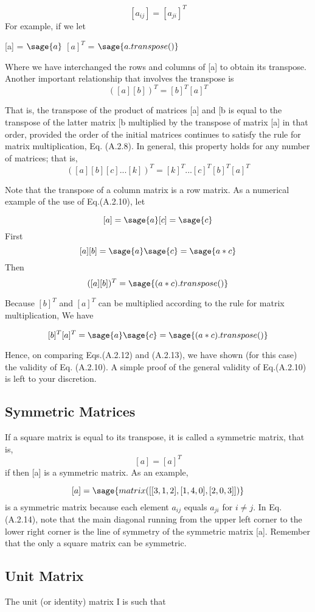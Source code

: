 \documentclass[12pt]{report}
\newcommand{\gen}[1]{
[#1_{{ij}}]
}
\begin{document}
\[\gen{a} =[a_{{ji}}]^T\]
For example, if we let
\begin{center}
[a] = $\sage{a}$
$[a]^T$ = $\sage{a.transpose()}$
\end{center}

Where we have interchanged the rows and columns of [a] to
obtain its transpose.
Another important relationship that involves the
transpose is
$$ ([a][b])^T = [b]^T [a]^T $$

That is, the transpose of the product of matrices [a] and
[b is equal to the transpose of the latter matrix
[b multiplied by the transpose of matrix [a] in
that order, provided the order of the initial matrices continues to
satisfy the rule for matrix multiplication, Eq. (A.2.8). In general,
this property holds for any number of matrices; that is,
$$([a][b][c]...[k])^T = [k]^T... [c]^T[b]^T[a]^T $$ 

Note that the transpose of a column matrix is a row matrix. As a
numerical example of the use of Eq.(A.2.10), let

$$[a] = \sage{a}  [c] = \sage{c}$$
First$$[a][b] = \sage{a}\sage{c}=\sage{a*c}$$
Then $$([a][b])^T= \sage{(a*c).transpose()}$$

Because $[b]^T$ and $[a]^T$ can be multiplied
according to the rule for matrix multiplication, We have

$$ [b]^T[a]^T = \sage{a} \sage{c} = \sage{(a*c).transpose()}$$

Hence, on comparing Eqs.(A.2.12) and (A.2.13), we have shown (for this
case) the validity of Eq. (A.2.10). A simple proof of the general
validity of Eq.(A.2.10) is left to your discretion.
\subsection{Symmetric Matrices}
If a square matrix is equal to its transpose, it is called a symmetric
matrix, that is,
$$ [a] = [a]^T $$
 if then [a] is a symmetric matrix. As an
example,

$$[a]=\sage{matrix([[3,1,2],[1,4,0],[2,0,3]])}$$
is a symmetric matrix because each element $a_{{ij}}$ equals $a_{{ji}}$ for $i
\neq j$. In Eq. (A.2.14), note that the main diagonal running from the
upper left corner to the lower right corner is the line of symmetry of
the symmetric matrix [a]. Remember that the only a square
matrix can be symmetric.
\subsection{Unit Matrix}
The unit (or identity) matrix I is such that
\end{document}
